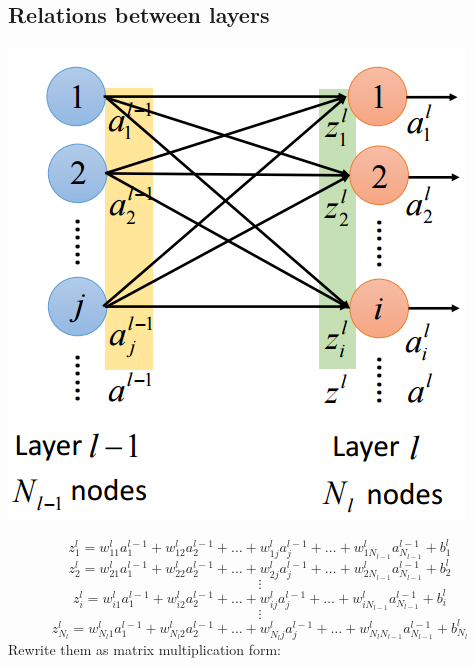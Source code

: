 \documentclass{article}
\begin{document}
\subsection{Relations between layers}
\begin{center}
\includegraphics[scale=0.4]{layer_1}
\end{center}
\[
z^l_1 = w^l_{11}a^{l-1}_1 + w^l_{12}a^{l-1}_2 + \dots + w^l_{1j}a^{l-1}_j + \dots + w^l_{1N_{l-1}}a^{l-1}_{N_{l-1}} + b^l_1
\]
\[
z^l_2 = w^l_{21}a^{l-1}_1 + w^l_{22}a^{l-1}_2 + \dots + w^l_{2j}a^{l-1}_j + \dots + w^l_{2N_{l-1}}a^{l-1}_{N_{l-1}} + b^l_2
\]
\[
\vdots
\]
\[
z^l_i = w^l_{i1}a^{l-1}_1 + w^l_{i2}a^{l-1}_2 + \dots + w^l_{ij}a^{l-1}_j + \dots + w^l_{iN_{l-1}}a^{l-1}_{N_{l-1}} + b^l_i
\]
\[
\vdots
\]
\[
z^l_{N_l} = w^l_{N_l1}a^{l-1}_1 + w^l_{N_l2}a^{l-1}_2 + \dots + w^l_{N_lj}a^{l-1}_j + \dots + w^l_{N_lN_{l-1}}a^{l-1}_{N_{l-1}} + b^l_{N_l}
\]
Rewrite them as matrix multiplication form:
\end{document}
